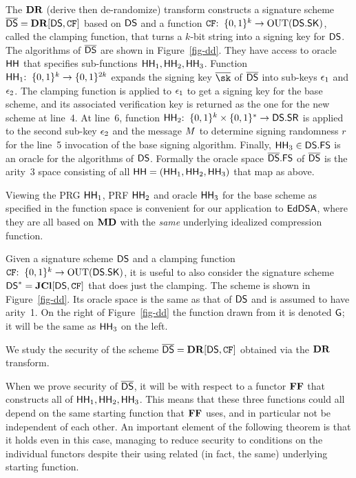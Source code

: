 The $\mathbf{DR}$ (derive then de-randomize) transform constructs a signature scheme $\overline{\mathsf{DS}} = \mathbf{DR}[\mathsf{DS},\mathtt{CF}]$ based on $\mathsf{DS}$ and a function $\mathtt{CF}{:\;\;}\{0,1\}^k\to\mathrm{OUT}(\mathsf{DS}.\mathsf{SK})$, called the clamping function, that turns a $k$-bit string into a signing key for $\mathsf{DS}$. The algorithms of $\overline{\mathsf{DS}}$ are shown in Figure~\ref{fig-dd}. They have access to oracle $\mathsf{HH}$ that specifies sub-functions $\mathsf{HH}_1,\mathsf{HH}_2,\mathsf{HH}_3$. Function $\mathsf{HH}_1{:\;\;}\{0,1\}^k\to\{0,1\}^{2k}$ expands the signing key $\osk$ of $\overline{\mathsf{DS}}$ into sub-keys ${\epsilon}_1$ and ${\epsilon}_2$. The clamping function is applied to ${\epsilon}_1$ to get a signing key for the base scheme, and its associated verification key is returned as the one for the new scheme at line~4. At line~6, function $\mathsf{HH}_2{:\;\;}\{0,1\}^k\times\{0,1\}^*\to\mathsf{DS}.\mathsf{SR}$ is applied to the second sub-key ${\epsilon}_2$ and the message ${M}$ to determine signing randomness $r$ for the line~5 invocation of the base signing algorithm. Finally, $\mathsf{HH}_3 \in \mathsf{DS}.\mathsf{FS}$ is an oracle for the algorithms of $\mathsf{DS}$. Formally the oracle space $\overline{\mathsf{DS}}.\mathsf{FS}$ of $\overline{\mathsf{DS}}$ is the arity~3 space consisting of all $\mathsf{HH} = (\mathsf{HH}_1,\mathsf{HH}_2,\mathsf{HH}_3)$ that map as above. 

Viewing the PRG $\mathsf{HH}_1$, PRF $\mathsf{HH}_2$ and oracle $\mathsf{HH}_3$ for the base scheme as specified in the function space is convenient for our application to $\mathsf{EdDSA}$, where they are all based on $\mathbf{MD}$ with the \textit{same} underlying idealized compression function.

 Given a signature scheme $\mathsf{DS}$ and a clamping function $\mathtt{CF}{:\;\;}\{0,1\}^k\to\mathrm{OUT}(\mathsf{DS}.\mathsf{SK})$, it is useful to also consider the signature scheme $\mathsf{DS}^* = \mathbf{JCl}[\mathsf{DS},\mathtt{CF}]$ that does just the clamping. The scheme is shown in Figure~\ref{fig-dd}. Its oracle space is the same as that of $\mathsf{DS}$ and is assumed to have arity~1. On the right of Figure~\ref{fig-dd} the function drawn from it is denoted $\mathsf{G}$; it will be the same as $\mathsf{HH}_3$ on the left.

 We study the security of the scheme $\overline{\mathsf{DS}} = \mathbf{DR}[\mathsf{DS},\mathtt{CF}]$ obtained via the $\mathbf{DR}$ transform.

When we prove security of $\overline{\mathsf{DS}}$, it will be with respect to a functor $\mathbf{FF}$ that constructs all of $\mathsf{HH}_1,\mathsf{HH}_2,\mathsf{HH}_3$. This means that these three functions could all depend on the same starting function that $\mathbf{FF}$ uses, and in particular not be independent of each other. An important element of the following theorem is that it holds even in this case, managing to reduce security to conditions on the individual functors despite their using related (in fact, the same) underlying starting function. 


